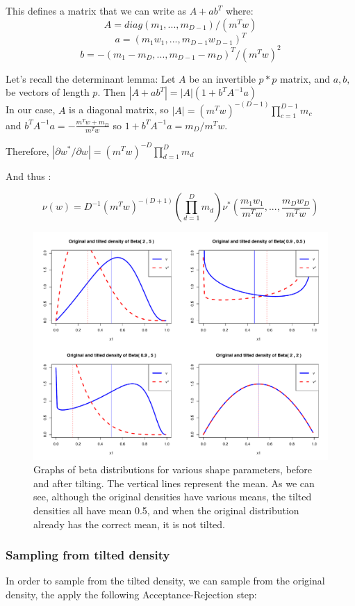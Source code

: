 \documentclass[10pt]{report}
\begin{document}
This defines a matrix that we can write as $A + ab^T$ where:
$$
A = diag(m_1,...,m_{D-1})/(m^Tw)
$$
$$
a = (m_1w_1,...,m_{D-1}w_{D-1})^T
$$
$$
b = -(m_1 - m_D,...,m_{D-1} - m_D)^T/(m^Tw)^2
$$

Let's recall the determinant lemma:
Let $A$ be an invertible $ p * p $ matrix, and $a,b,$ be vectors of length $p$.
Then $|A + ab^T| = |A|(1 + b^TA^{-1}a)$ \\

In our case, $A$ is a diagonal matrix, so $|A| = (m^Tw)^{-(D-1)} \prod_{c=1}^{D-1}m_c$\\
and $b^TA^{-1}a = -\frac{m^Tw + m_D}{m^Tw}$ so $1 + b^TA^{-1}a = m_D/m^Tw$.

Therefore, $|\partial w^*/\partial w| = (m^Tw)^{-D} \prod_{d=1}^Dm_d$

And thus :

$$
\nu (w) = D^{-1}(m^Tw)^{-(D+1)} (\prod_{d=1}^D m_d) \nu^* (\frac{m_1w_1}{m^Tw},...,\frac{m_Dw_D}{m^Tw})
$$

\begin{figure}[h]
\centering
\includegraphics[width=\textwidth]{density_tilt.pdf}
\caption{Graphs of beta distributions for various shape parameters, before and after tilting. The vertical lines represent the mean. As we can see, although the original densities have various means, the tilted densities all have mean 0.5, and when the original distribution already has the correct mean, it is not tilted.}
\label{fig:density_tilt}
\end{figure}

\subsubsection{Sampling from tilted density}
In order to sample from the tilted density, we can sample from the original density, the apply the following Acceptance-Rejection step:
\end{document}
